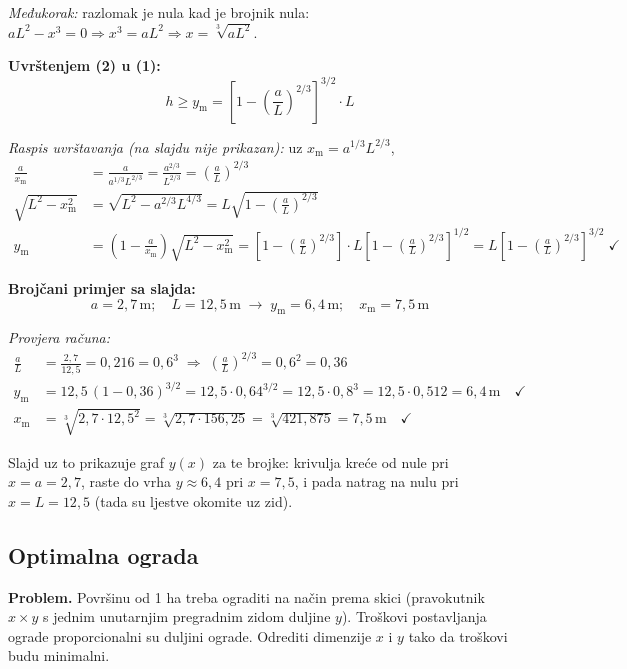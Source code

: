\emph{Međukorak:} razlomak je nula kad je brojnik nula: $aL^2 - x^3 = 0
\Rightarrow x^3 = aL^2 \Rightarrow x = \sqrt[3]{aL^2}$.

\textbf{Uvrštenjem (2) u (1):}
\[
h \ge y_{\mathrm m} = \left[1 - \left(\frac{a}{L}\right)^{2/3}\right]^{3/2}\cdot L
\]

\emph{Raspis uvrštavanja (na slajdu nije prikazan):} uz
$x_{\mathrm m} = a^{1/3}L^{2/3}$,
\begin{align}
\frac{a}{x_{\mathrm m}} &= \frac{a}{a^{1/3}L^{2/3}} = \frac{a^{2/3}}{L^{2/3}}
= \left(\frac{a}{L}\right)^{2/3} \\
\sqrt{L^2 - x_{\mathrm m}^2} &= \sqrt{L^2 - a^{2/3}L^{4/3}}
= L\sqrt{1 - \left(\frac{a}{L}\right)^{2/3}} \\
y_{\mathrm m} &= \left(1 - \frac{a}{x_{\mathrm m}}\right)
                 \sqrt{L^2 - x_{\mathrm m}^2}
= \left[1 - \left(\tfrac{a}{L}\right)^{2/3}\right]
  \cdot L\left[1 - \left(\tfrac{a}{L}\right)^{2/3}\right]^{1/2}
= L\left[1 - \left(\tfrac{a}{L}\right)^{2/3}\right]^{3/2} \; \checkmark
\end{align}

\textbf{Brojčani primjer sa slajda:}
\[
a = 2{,}7\,\text{m}; \quad L = 12{,}5\,\text{m}
\;\to\; y_{\mathrm m} = 6{,}4\,\text{m}; \quad x_{\mathrm m} = 7{,}5\,\text{m}
\]

\emph{Provjera računa:}
\begin{align}
\frac{a}{L} &= \frac{2{,}7}{12{,}5} = 0{,}216 = 0{,}6^3
\;\Rightarrow\; \left(\frac{a}{L}\right)^{2/3} = 0{,}6^2 = 0{,}36 \\
y_{\mathrm m} &= 12{,}5\,(1 - 0{,}36)^{3/2} = 12{,}5 \cdot 0{,}64^{3/2}
= 12{,}5 \cdot 0{,}8^3 = 12{,}5 \cdot 0{,}512 = 6{,}4\,\text{m} \quad \checkmark \\
x_{\mathrm m} &= \sqrt[3]{2{,}7 \cdot 12{,}5^2} = \sqrt[3]{2{,}7 \cdot 156{,}25}
= \sqrt[3]{421{,}875} = 7{,}5\,\text{m} \quad \checkmark
\end{align}

Slajd uz to prikazuje graf $y(x)$ za te brojke: krivulja kreće od nule pri
$x = a = 2{,}7$, raste do vrha $y \approx 6{,}4$ pri $x = 7{,}5$, i pada natrag
na nulu pri $x = L = 12{,}5$ (tada su ljestve okomite uz zid).

\subsection{Optimalna ograda}

\textbf{Problem.} Površinu od 1 ha treba ograditi na način prema skici
(pravokutnik $x \times y$ s jednim unutarnjim pregradnim zidom duljine $y$).
Troškovi postavljanja ograde proporcionalni su duljini ograde. Odrediti
dimenzije $x$ i $y$ tako da troškovi budu minimalni.

